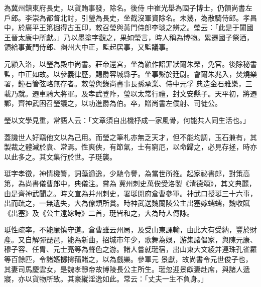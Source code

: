 \begin{pinyinscope}
 為冀州鎮東府長史，以貨賄事發，除名。後侍
 中崔光舉為國子博士，仍領尚書左戶郎。李崇為都督北討，引瑩為長史，坐截沒軍資除名。未幾，為散騎侍郎。孝昌中，於廣平王第掘得古玉印，敕召瑩與黃門侍郎李琰之辨之。瑩云：「此是于闐國王晉太康中所獻。」乃以墨塗字觀之，果如瑩言，時人稱為博物。累遷國子祭酒，領給事黃門侍郎、幽州大中正，監起居事，又監議事。



 元顥入洛，以瑩為殿中尚書。莊帝還宮，坐為顥作詔罪狀爾朱榮，免官。後除秘書監，中正如故。以參義律歷，賜爵容城縣子。坐事繫於廷尉。會爾朱兆入，焚燒樂署，鐘石管弦略無存者。敕瑩與錄尚書事長孫承業、侍中元孚
 典造金石雅樂，三載乃就。遷車騎大將軍。及孝武登阼，瑩以太常行禮，封文安縣子。天平初，將遷鄴，齊神武困召瑩議之，以功進爵為伯。卒，贈尚書左僕射、司徒公。



 瑩以文學見重，常語人云：「文章須自出機杼成一家風骨，何能共人同生活也。」



 蓋譏世人好竊他文以為己用。而瑩之筆札亦無乏天才，但不能均調，玉石兼有，其製裁之體減於袁、常焉。性爽俠，有節氣，士有窮厄，以命歸之，必見存拯，時亦以此多之。其文集行於世。子珽襲。



 珽字孝徵，神情機警，詞藻遒逸，少馳令譽，為當世所推。起家祕書郎，對策高第，為尚書儀曹郎中，典儀注。嘗為
 冀州刺史萬俟受洛製《清德頌》，其文典麗，由是齊神武聞之。時文宣為并州刺史，署珽開府倉曹參軍。神武口授珽三十六事，出而疏之，一無遺失，大為僚類所賞。時神武送魏蘭陵公主出塞嫁蠕蠕，魏收賦《出塞》及《公主遠嫁詩》二首，珽皆和之，大為時人傳詠。



 珽性疏率，不能廉慎守道。倉曹雖云州局，及受山東課輸，由此大有受納，豐於財產。又自解彈琵琶，能為新曲，招城市年少，歌舞為娛，游集諸倡家，與陳元康、穆子容、任胄、元士亮等為聲色之游。諸人嘗就珽宿，出山東大文綾并連珠孔雀羅等百餘匹，令諸嫗擲摴蒱賭之，以為戲樂。參軍元
 景獻，故尚書令元世俊子也，其妻司馬慶雲女，是魏孝靜帝故博陵長公主所生。珽忽迎景獻妻赴席，與諸人遞寢，亦以貨物所致。其豪縱淫逸如此。常云：「丈夫一生不負身。」




\end{pinyinscope}
